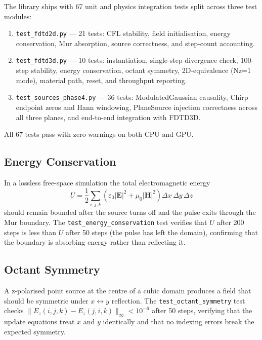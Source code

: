 \documentclass[10pt,twocolumn]{article}
\begin{document}
The library ships with 67 unit and physics integration tests split across
three test modules:

\begin{enumerate}
  \item \texttt{test\_fdtd2d.py} — 21 tests: CFL stability, field
        initialisation, energy conservation, Mur absorption, source
        correctness, and step-count accounting.
  \item \texttt{test\_fdtd3d.py} — 10 tests: instantiation, single-step
        divergence check, 100-step stability, energy conservation, octant
        symmetry, 2D-equivalence (Nz=1 mode), material path, reset, and
        throughput reporting.
  \item \texttt{test\_sources\_phase4.py} — 36 tests: ModulatedGaussian
        causality, Chirp endpoint zeros and Hann windowing, PlaneSource
        injection correctness across all three planes, and end-to-end
        integration with FDTD3D.
\end{enumerate}

All 67 tests pass with zero warnings on both CPU and GPU.

\subsection{Energy Conservation}

In a lossless free-space simulation the total electromagnetic energy
\begin{equation}
  U = \frac{1}{2}\sum_{i,j,k}\!\left(\varepsilon_0 |\mathbf{E}|^2
      + \mu_0 |\mathbf{H}|^2\right)\Delta x\,\Delta y\,\Delta z
\end{equation}
should remain bounded after the source turns off and the pulse exits through
the Mur boundary. The \texttt{test\_energy\_conservation} test verifies that
$U$ after 200 steps is less than $U$ after 50 steps (the pulse has left the
domain), confirming that the boundary is absorbing energy rather than
reflecting it.

\subsection{Octant Symmetry}

A z-polarised point source at the centre of a cubic domain produces a field
that should be symmetric under $x \leftrightarrow y$ reflection. The
\texttt{test\_octant\_symmetry} test checks $\|E_z(i,j,k) - E_z(j,i,k)\|_\infty
< 10^{-6}$ after 50 steps, verifying that the update equations treat $x$ and
$y$ identically and that no indexing errors break the expected symmetry.
\end{document}
